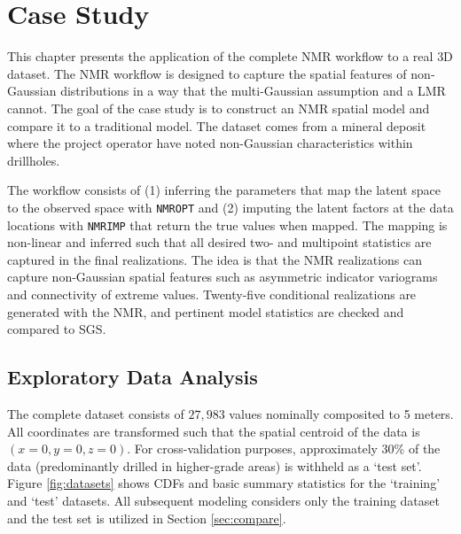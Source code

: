 
\chapter{Case Study}
\label{ch:casestudy}

This chapter presents the application of the complete \gls{NMR} workflow to a real \gls{3D} dataset. The \gls{NMR} workflow is designed to capture the spatial features of non‐Gaussian distributions in a way that the multi-Gaussian assumption and a \gls{LMR} cannot. The goal of the case study is to construct an \gls{NMR} spatial model and compare it to a traditional model. The dataset comes from a mineral deposit where the project operator have noted non-Gaussian characteristics within drillholes.

The workflow consists of (1) inferring the parameters that map the latent space to the observed space with \texttt{NMROPT} and (2) imputing the latent factors at the data locations with \texttt{NMRIMP} that return the true values when mapped. The mapping is non-linear and inferred such that all desired two- and multipoint statistics are captured in the final realizations. The idea is that the \gls{NMR} realizations can capture non-Gaussian spatial features such as asymmetric indicator variograms and connectivity of extreme values. Twenty-five conditional realizations are generated with the \gls{NMR}, and pertinent model statistics are checked and compared to \gls{SGS}.

\FloatBarrier
\section{Exploratory Data Analysis}
\label{sec:eda}

The complete dataset consists of $27,983$ values nominally composited to 5 meters. All coordinates are transformed such that the spatial centroid of the data is $(x=0,y=0,z=0)$. For cross-validation purposes, approximately 30\% of the data (predominantly drilled in higher-grade areas) is withheld as a `test set'. Figure \ref{fig:datasets} shows \glspl{CDF} and basic summary statistics for the `training' and `test' datasets. All subsequent modeling considers only the training dataset and the test set is utilized in Section \ref{sec:compare}.

